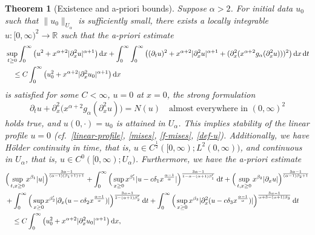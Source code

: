 \documentclass[reqno,12pt]{amsart}
\renewcommand{\d}{\ensuremath{\mathrm{d}}}
\newcommand{\R}{\ensuremath{\mathbb{R}}}
\renewcommand{\d}{\ensuremath{{\rm d}}}
\newtheorem{theorem}{Theorem}[section]
\numberwithin{equation}{section}
\begin{document}
\begin{theorem}[Existence and a-priori bounds]\label{th:ex}
Suppose $\alpha > 2$. For initial data $u_0$ such that $\|u_0\|_{U_\alpha}$ is sufficiently small, there exists a %
locally integrable $u \colon [0,\infty)^2 \to \R$ such that
the a-priori estimate
%
\begin{align}\nonumber
& \sup_{t \ge 0} \int_0^\infty \big(u^2 + x^{\alpha+2} |\partial_x^2 u|^{\alpha+1}\big) \, \d x + \int_0^\infty \int_0^\infty \big((\partial_t u)^2 + x^{\alpha+2} |\partial_x^2 u|^{\alpha+1} + (\partial_x^2 (x^{\alpha+2} g_\alpha(\partial_x^2 u)))^2\big) \, \d x \, \d t \nonumber\\
& \quad \le C \int_0^\infty \big(u_0^2 + x^{\alpha+2} |\partial_x^2 u_0|^{\alpha+1}\big) \, \d x \label{apriori-u}
\end{align}
%
is satisfied for some $C < \infty$, $u = 0$ at $x = 0$, the strong formulation
%
\begin{equation}\label{eq-strong}
\partial_t u + \partial_x^2\big(x^{\alpha+2} g_\alpha(\partial_x^2 u)\big) = N(u) \quad \text{almost everywhere in } (0,\infty)^2
\end{equation}
%
holds true, and $u(0,\cdot) = u_0$ is attained in $U_\alpha$.
This implies stability of the linear profile $u = 0$ (cf.~\eqref{linear-profile}, \eqref{mises}, \eqref{f-mises}, \eqref{def-u}). Additionally, we have H\"older continuity in time, that is, $u \in C^{\frac 1 2}([0,\infty);L^2(0,\infty))$, and continuous in $U_\alpha$, that is, $u \in C^0([0,\infty);U_\alpha)$. Furthermore, we have the a-priori estimate
%
\begin{align}\nonumber
& \Big(\sup_{t, x \ge 0} x^{\beta_1} |u|\Big)^{\frac{3 \alpha-1}{(\alpha-1) (\beta_1+1) + 1}} + \int_0^\infty \Big(\sup_{x \ge 0} x^{\beta_1'} |u - c \delta_1 x^{\frac{\alpha-1}{\alpha}}|\Big)^{\frac{3\alpha-1}{1-\alpha-(\alpha+1) \beta_1'}} \, \d t + \Big(\sup_{t, x \ge 0} x^{\beta_2} |\partial_x u|\Big)^{\frac{3 \alpha-1}{(\alpha-1) \beta_2 + 1}} \\
& + \int_0^\infty \Big(\sup_{x \ge 0} x^{\beta_2'} |\partial_x (u - c \delta_2 x^{\frac{\alpha-1}{\alpha}})|\Big)^{\frac{3\alpha-1}{2-(\alpha+1)\beta_2'}} \, \d t + \int_0^\infty \Big(\sup_{x \ge 0} x^{\beta_3} |\partial_x^2 (u- c \delta_3 x^{\frac{\alpha-1}{\alpha}})|\Big)^{\frac{3\alpha-1}{\alpha+3 - (\alpha+1)\beta_3}} \, \d t \nonumber \\
& \quad \le C \int_0^\infty \big(u_0^2 + x^{\alpha+2} |\partial_x^2 u_0|^{\alpha+1}\big) \, \d x, \label{embed-main}

\end{align}
\end{theorem}
\end{document}
